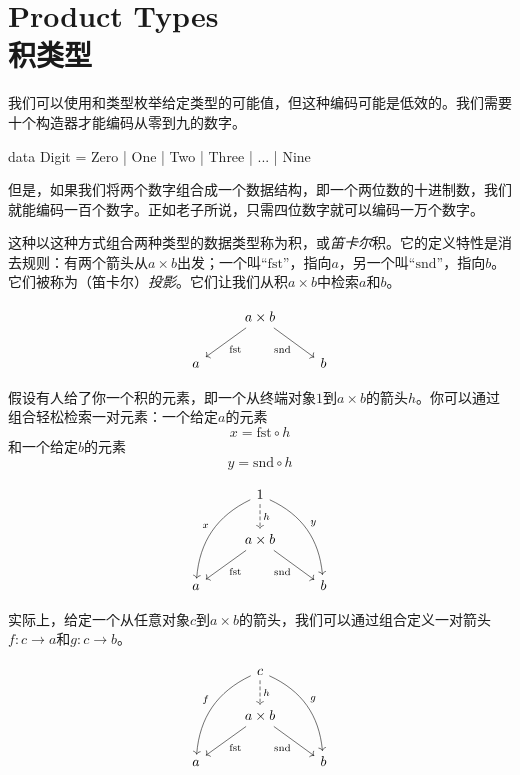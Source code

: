 \documentclass[DaoFP]{subfiles}
\begin{document}
 \setcounter{chapter}{4}

 \chapter{Product Types\\积类型}

 我们可以使用和类型枚举给定类型的可能值，但这种编码可能是低效的。我们需要十个构造器才能编码从零到九的数字。
 \begin{haskell}
  data Digit = Zero | One | Two | Three | ... | Nine
 \end{haskell}
 但是，如果我们将两个数字组合成一个数据结构，即一个两位数的十进制数，我们就能编码一百个数字。正如老子所说，只需四位数字就可以编码一万个数字。

 这种以这种方式组合两种类型的数据类型称为积，或\emph{笛卡尔}积。它的定义特性是消去规则：有两个箭头从$a \times b$出发；一个叫“$\text{fst}$”，指向$a$，另一个叫“$\text{snd}$”，指向$b$。它们被称为（笛卡尔）\emph{投影}。它们让我们从积$a \times b$中检索$a$和$b$。

 \[
  \begin{tikzcd}
   & a \times b
   \arrow[dl,  "\text{fst}"]
   \arrow[dr,   "\text{snd}"']
   \\
   a && b
  \end{tikzcd}
 \]

 假设有人给了你一个积的元素，即一个从终端对象$1$到$a \times b$的箭头$h$。你可以通过组合轻松检索一对元素：一个给定$a$的元素
 \[x = \text{fst} \circ h \]
 和一个给定$b$的元素
 \[y = \text{snd} \circ h \]

 \[
  \begin{tikzcd}
   & 1
   \arrow[d, dashed, "h"]
   \arrow[ddl, bend right, "x"']
   \arrow[ddr, bend left, "y"]
   \\
   &a \times b
   \arrow[dl,  "\text{fst}"]
   \arrow[dr,   "\text{snd}"']
   \\
   a && b
  \end{tikzcd}
 \]

 实际上，给定一个从任意对象$c$到$a \times b$的箭头，我们可以通过组合定义一对箭头$f \colon c \to a$和$g \colon c \to b$。

 \[
  \begin{tikzcd}
   & c
   \arrow[d, dashed, "h"]
   \arrow[ddl, bend right, "f"']
   \arrow[ddr, bend left, "g"]
   \\
   &a \times b
   \arrow[dl,  "\text{fst}"]
   \arrow[dr,   "\text{snd}"']
   \\
   a && b
  \end{tikzcd}
 \]
\end{document}
